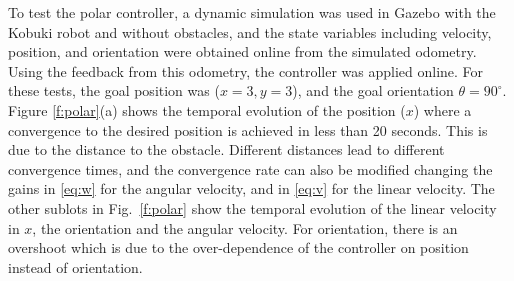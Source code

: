 \documentclass[conference]{IEEEtran}
\begin{document}
To test the polar controller, a dynamic simulation was used in Gazebo with the
Kobuki robot and without obstacles, and the state variables including velocity,
position, and orientation were obtained online from the simulated odometry.
Using the feedback from this odometry, the controller was applied online. For
these tests, the goal position was
($x = 3,y = 3$), and the goal orientation $\theta = 90^{\circ}$.
Figure \ref{f:polar}(a) shows the temporal
evolution of the position ($x$) where a convergence to the desired position is
achieved in less than 20 seconds. This is due to the distance to the
obstacle. Different distances lead to different convergence times, and the
convergence rate can also be modified changing the gains in \eqref{eq:w} for
the angular velocity, and in \eqref{eq:v} for the linear velocity. The other
sublots in Fig.~\ref{f:polar} show the temporal evolution of the linear
velocity in $x$, the orientation and the angular velocity.
For orientation, there is an overshoot which is due to the over-dependence of
the controller on position instead of orientation.



\end{document}
